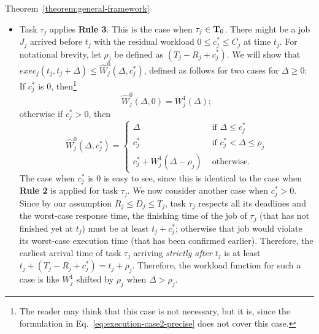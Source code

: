 \begin{appProof}{Theorem~\ref{theorem:general-framework}}
\begin{itemize}
\item Task $\tau_j$ applies {\bf Rule 3}. This is the case when
  $\tau_j \in {\bf T}_0$. There might be a job $J_j$ arrived before
  $t_j$ with the residual workload $0 \leq c_j^* \leq C_j$ at time
  $t_j$. For notational brevity, let $\rho_j$ be defined as $(T_j-R_j +
  c_j^*)$. We will show that $exec_j(t_j, t_j+\Delta) \leq
  \widehat{W}_j^0(\Delta, c_j^*)$, defined as follows for two cases for $\Delta \geq 0$:
  If $c_j^*$ is $0$, then\footnote{The reader may think that this case
    is not necessary, but it is, since the formulation in
    Eq.~\eqref{eq:execution-case2-precise} does not cover this case.}
  \begin{equation}
  \label{eq:execution-case2-cj*=0}
 \widehat{W}_j^0(\Delta, 0)=    W_j^1(\Delta);
  \end{equation}
  otherwise if $c_j^* > 0$, then
  \begin{equation}
    \label{eq:execution-case2-precise}
    \widehat{W}_j^0(\Delta, c_j^*)=
    \begin{cases}
      \Delta & \mbox{ if } \Delta \leq  c_j^*\\
      c_j^* & \mbox{ if } c_j^* < \Delta \leq  \rho_j\\
      c_j^* + W_j^1(\Delta-\rho_j) & \mbox{ otherwise}.
    \end{cases}
  \end{equation}
  The case when $c_j^*$ is $0$ is easy to see, since this is identical to
  the case when {\bf Rule 2} is applied for task $\tau_j$. We now consider another case when $c_j^* > 0$.
  Since by our assumption $R_j \leq D_j \leq T_j$, task $\tau_j$ respects all its deadlines and the
  worst-case response time, the finishing time of the job of $\tau_j$ (that has not finished yet at $t_j$) must be at least $t_j + c_j^*$; otherwise that job would violate its worst-case execution time (that has been confirmed earlier). Therefore, the earliest arrival time of task $\tau_j$
  arriving \emph{strictly after $t_j$} is at least $t_j + (T_j-R_j +
  c_j^*) = t_j+\rho_j$. Therefore, the workload function for such a case is like $W_j^1$ shifted by $\rho_j$ when $\Delta > \rho_j$.
\end{itemize}



\end{appProof}
